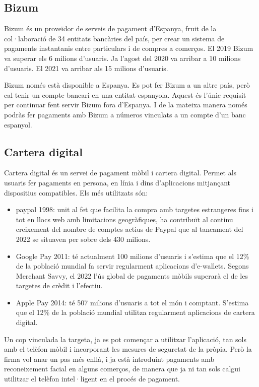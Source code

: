 \subsection*{Bizum}



Bizum és un proveïdor de serveis de pagament d'Espanya, fruit de la col·laboració de 34 entitats bancàries del país, per crear un sistema de pagaments instantanis entre particulars i de compres a comerços. El 2019 Bizum va superar els 6 milions d'usuaris. Ja l'agost del 2020 va arribar a 10 milions d'usuaris. El 2021 va arribar als 15 milions d'usuaris.

Bizum només està disponible a Espanya. Es pot fer Bizum a un altre país, però cal tenir un compte bancari en una entitat espanyola. Aquest és l'únic requisit per continuar fent servir Bizum fora d'Espanya. I de la mateixa manera només podràs fer pagaments amb Bizum a números vinculats a un compte d'un banc espanyol.


\subsection*{Cartera digital}

Cartera digital és un servei de pagament mòbil i cartera digital. Permet als usuaris fer pagaments en persona, en línia i dins d'aplicacions mitjançant dispositius compatibles. Els més utilitzats són:

\begin{itemize}
    \item paypal 1998: unit al fet que facilita la compra amb targetes estrangeres fins i tot en llocs web amb limitacions geogràfiques, ha contribuït al continu creixement del nombre de comptes actius de Paypal que al tancament del 2022 se situaven per sobre dels 430 milions.
    \item Google Pay 2011: té actualment 100 milions d'usuaris i s'estima que el 12\% de la població mundial fa servir regularment aplicacions d'e-wallets. Segons Merchant Savvy, el 2022 l'ús global de pagaments mòbils superarà el de les targetes de crèdit i l'efectiu.
    \item Apple Pay 2014: té 507 milions d'usuaris a tot el món i comptant. S'estima que el 12\% de la població mundial utilitza regularment aplicacions de cartera digital.
\end{itemize}

Un cop vinculada la targeta, ja es pot començar a utilitzar l'aplicació, tan sols amb el telèfon mòbil i incorporant les mesures de seguretat de la pròpia. Però la firma vol anar un pas més enllà, i ja està introduint pagaments amb reconeixement facial en alguns comerços, de manera que ja ni tan sols calgui utilitzar el telèfon intel·ligent en el procés de pagament.











